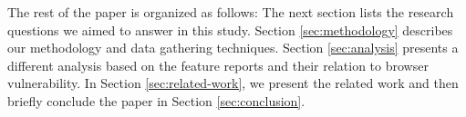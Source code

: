 The rest of the paper is organized as follows: The next section lists
the research questions we aimed to answer in this study. Section
\ref{sec:methodology} describes our methodology and data gathering
techniques. Section \ref{sec:analysis} presents a different analysis
based on the feature reports and their relation to browser
vulnerability. In Section \ref{sec:related-work}, we present the
related work and then briefly conclude the paper in Section
\ref{sec:conclusion}.
